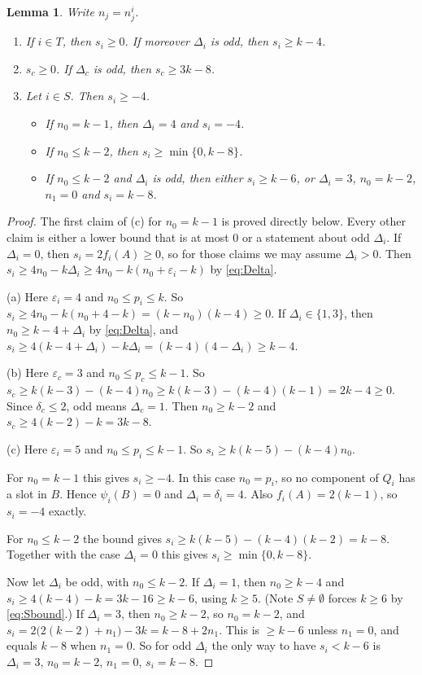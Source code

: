 \documentclass[11pt]{amsart}
\newtheorem{lemma}[theorem]{Lemma}
\theoremstyle{definition}
\theoremstyle{remark}
\begin{document}
\begin{lemma}\label{lem:s}
Write $n_j=n_j^i$.
\begin{enumerate}[label=\textup{(\alph*)},leftmargin=*]
\item If $i\in T$, then $s_i\ge0$. If moreover $\Delta_i$ is odd, then $s_i\ge k-4$.
\item $s_c\ge0$. If $\Delta_c$ is odd, then $s_c\ge 3k-8$.
\item Let $i\in S$. Then $s_i\ge-4$.
  \begin{itemize}
  \item If $n_0=k-1$, then $\Delta_i=4$ and $s_i=-4$.
  \item If $n_0\le k-2$, then $s_i\ge\min\{0,k-8\}$.
  \item If $n_0\le k-2$ and $\Delta_i$ is odd, then either $s_i\ge k-6$, or $\Delta_i=3$,
  $n_0=k-2$, $n_1=0$ and $s_i=k-8$.
  \end{itemize}
\end{enumerate}
\end{lemma}

\begin{proof}
The first claim of (c) for $n_0=k-1$ is proved directly below. Every other claim is either a
lower bound that is at most $0$ or a statement about odd $\Delta_i$. If $\Delta_i=0$, then
$s_i=2f_i(A)\ge0$, so for those claims we may assume $\Delta_i>0$. Then
$s_i\ge 4n_0-k\Delta_i\ge 4n_0-k(n_0+\varepsilon_i-k)$ by \eqref{eq:Delta}.

(a) Here $\varepsilon_i=4$ and $n_0\le p_i\le k$. So
$s_i\ge 4n_0-k(n_0+4-k)=(k-n_0)(k-4)\ge0$. If $\Delta_i\in\{1,3\}$, then
$n_0\ge k-4+\Delta_i$ by \eqref{eq:Delta}, and
$s_i\ge 4(k-4+\Delta_i)-k\Delta_i=(k-4)(4-\Delta_i)\ge k-4$.

(b) Here $\varepsilon_c=3$ and $n_0\le p_c\le k-1$. So
$s_c\ge k(k-3)-(k-4)n_0\ge k(k-3)-(k-4)(k-1)=2k-4\ge0$. Since $\delta_c\le2$, odd means
$\Delta_c=1$. Then $n_0\ge k-2$ and $s_c\ge 4(k-2)-k=3k-8$.

(c) Here $\varepsilon_i=5$ and $n_0\le p_i\le k-1$. So $s_i\ge k(k-5)-(k-4)n_0$.

For $n_0=k-1$ this gives $s_i\ge -4$. In this case $n_0=p_i$, so no component of $Q_i$ has
a slot in $B$. Hence $\psi_i(B)=0$ and $\Delta_i=\delta_i=4$. Also $f_i(A)=2(k-1)$, so
$s_i=-4$ exactly.

For $n_0\le k-2$ the bound gives $s_i\ge k(k-5)-(k-4)(k-2)=k-8$. Together with the case
$\Delta_i=0$ this gives $s_i\ge\min\{0,k-8\}$.

Now let $\Delta_i$ be odd, with $n_0\le k-2$. If $\Delta_i=1$, then $n_0\ge k-4$ and
$s_i\ge 4(k-4)-k=3k-16\ge k-6$, using $k\ge5$. (Note $S\ne\emptyset$ forces $k\ge6$ by
\eqref{eq:Sbound}.) If $\Delta_i=3$, then $n_0\ge k-2$, so $n_0=k-2$, and
$s_i=2\bigl(2(k-2)+n_1\bigr)-3k=k-8+2n_1$. This is $\ge k-6$ unless $n_1=0$, and equals $k-8$
when $n_1=0$. So for odd $\Delta_i$ the only way to have $s_i<k-6$ is $\Delta_i=3$,
$n_0=k-2$, $n_1=0$, $s_i=k-8$.
\end{proof}
\end{document}
